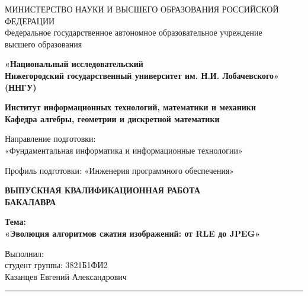 \begin{titlepage}
    \begin{center}
    
    {\normalsize
    МИНИСТЕРСТВО НАУКИ И ВЫСШЕГО ОБРАЗОВАНИЯ РОССИЙСКОЙ ФЕДЕРАЦИИ\\
    Федеральное государственное автономное образовательное учреждение\\
    высшего образования
    }
    
    \textbf{
    «Национальный исследовательский\\
    Нижегородский государственный университет им. Н.И. Лобачевского»\\
    (ННГУ)
    }
    
    \vfill
    
    \textbf{
    Институт информационных технологий, математики и механики\\
    Кафедра алгебры, геометрии и дискретной математики
    }
    
    \vfill
    
    {\centering
    \normalsize
    Направление подготовки:\\
    «Фундаментальная информатика и информационные технологии»

    Профиль подготовки: «Инженерия программного обеспечения»
    \par}
    
    \vfill
    
    \begin{center}
    \textbf{
    ВЫПУСКНАЯ КВАЛИФИКАЦИОННАЯ РАБОТА\\
    БАКАЛАВРА
    }
    
    \vspace{1.5cm}
    
    \textbf{
    Тема:\\
    «Эволюция алгоритмов сжатия изображений: от RLE до JPEG»
    }
    \end{center}
    
    \vfill
    
    \begin{flushright}
    Выполнил:\\
    студент группы: 3821Б1ФИ2 \\
    Казанцев Евгений Александрович \\
    \hspace{4cm} \rule{4cm}{0.4pt} \\ %
    
    \vspace{1cm}
    

\end{flushright}
\end{center}
\end{titlepage}
